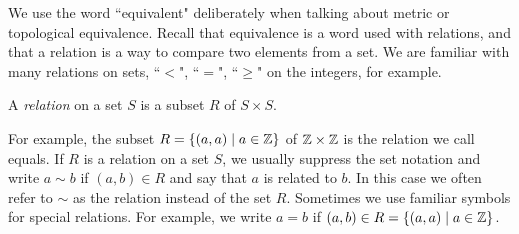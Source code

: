 \begin{comment}

\ActivitySolution

\ba
\item Let $x = (x_1,x_2)$ and $y=(y_1,y_2)$ be in $\R^2$. Notice that 
\[d_M(x,y) = \max\{| x_1-y_1 |, | x_2-y_2 |\} \leq | x_1-y_1 | + | x_2-y_2 | = d_T(x,y).\]
Also,
\[d_T(x,y) = | x_1-y_1 | + | x_2-y_2 | \leq 2\max\{| x_1-y_1 |, | x_2-y_2 |\} = 2d_M(x,y).\]
So $(\R^2,d_T)$ and $(\R^2, d_M)$ are topologically equivalent. 

\item Let $x = (x_1,x_2)$ and $y=(y_1,y_2)$ be in $\R^2$. Notice that 
\[d_E(x,y) = \sqrt{(x_1-y_1)^2 + (x_2-y_2)^2} \leq \sqrt{(x_1-y_1)^2} + \sqrt{(x_2-y_2)^2} =  | x_1-y_1 | + | x_2-y_2 | \leq d_T(x,y).\]
Also,
\[d_T(x,y) = | x_1-y_1 | + | x_2-y_2 | = \sqrt{(x_1-y_1)^2} + \sqrt{(x_2-y_2)^2} \leq \sqrt{(x_1-y_1)^2+(x_2-y_2)^2} + \sqrt{(x_1-y_1)^2+(x_2-y_2)^2} = 2d_E(x,y).\]
So $(\R^2,d_T)$ and $(\R^2, d_T)$ are topologically equivalent. 

\item If $f: (\R^2,d_T) \to (\R^2, d_M)$ and $g: (\R^2,d_E) \to (\R^2, d_T)$ are homeomorphisms, then we know that $f \circ g$ is a continuous bijection as is $(f \circ g)^{-1}$. So it must be the case that $(\R^2,d_E)$ and $(\R^2, d_M)$ are topologically equivalent. 
 
\ea

\end{comment}


\label{sec_relations}
We use the word ``equivalent" deliberately when talking about metric or topological equivalence. Recall that equivalence is a word used with relations, and that a relation is a way to compare two elements from a set. We are familiar with many relations on sets, ``$<$", ``$=$", ``$\geq$" on the integers, for example.  

\begin{definition} A \emph{relation} on a set $S$ is a subset $R$ of $S \times S$.
\end{definition}

For example, the subset $R = \{(a,a) \mid a \in \mathbb{Z} \}$ of $\mathbb{Z} \times \mathbb{Z}$ is the relation we call equals. If $R$ is a relation on a set $S$, we usually suppress the set notation and write $a \sim b$ if $(a,b) \in R$ and say that $a$ is related to $b$. In this case we often refer to $\sim$ as the relation instead of the set $R$. Sometimes we use familiar symbols for special relations. For example, we write $a = b$ if $(a,b) \in R = \{(a,a) \mid a \in \mathbb{Z} \}$.

